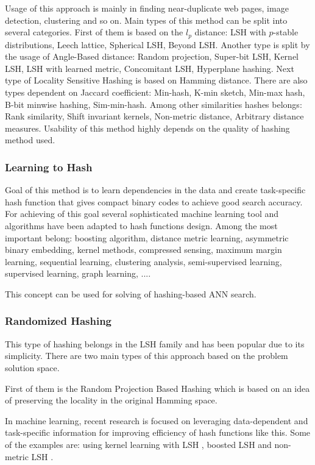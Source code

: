 Usage of this approach is mainly in finding near-duplicate web pages, image detection, clustering and so on. 
Main types of this method can be split into several categories.
First of them is based on the $l_p$ distance: LSH with $p$-stable distributions, Leech lattice, Spherical LSH, Beyond LSH.
Another type is split by the usage of Angle-Based distance: Random projection, Super-bit LSH, Kernel LSH, LSH with learned metric, Concomitant LSH, Hyperplane hashing.
Next type of Locality Sensitive Hashing is based on Hamming distance. There are also types dependent on Jaccard coefficient: Min-hash, K-min sketch, Min-max hash, B-bit minwise hashing, Sim-min-hash.
Among other similarities hashes belongs: Rank similarity, Shift invariant kernels, Non-metric distance, Arbitrary distance measures.
Usability of this method highly depends on the quality of hashing method used.
\subsubsection{Learning to Hash}
Goal of this method is to learn dependencies in the data and create task-specific hash function that gives compact binary codes to achieve good search accuracy. \cite{learnHash} For achieving of this goal several sophisticated machine learning tool and algorithms have been adapted to hash functions design. Among the most important belong: boosting algorithm, distance metric learning, asymmetric binary embedding, kernel methods, compressed sensing, maximum margin learning, sequential learning, clustering analysis, semi-supervised learning, supervised learning, graph learning, ....

This concept can be used for solving of hashing-based ANN search.

\subsubsection{Randomized Hashing}
This type of hashing belongs in the LSH family and has been popular due to its simplicity. There are two main types of this approach based on the problem solution space. 

First of them is the Random Projection Based Hashing which is based on an idea of preserving the locality in the original Hamming space.

In machine learning, recent research is focused on leveraging data-dependent and task-specific information for improving efficiency of hash functions like this. Some of the examples are: using kernel learning with LSH \cite{kernelLSH}, boosted LSH \cite{boostLSH} and non-metric LSH \cite{nonMLSH}.

